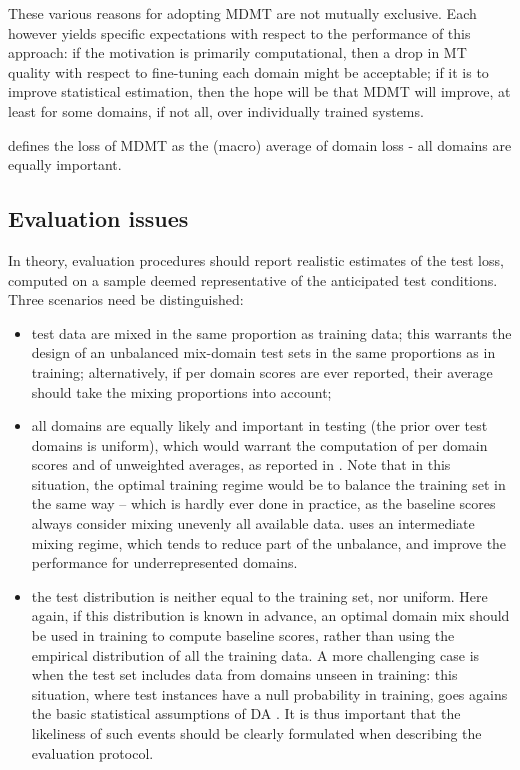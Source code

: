\documentclass[11pt]{article}
\begin{document}
These various reasons for adopting MDMT are not mutually exclusive. Each however yields specific expectations with respect to the performance of this approach: if the motivation is primarily computational, then a drop in MT quality with respect to fine-tuning each domain might be acceptable; if it is to improve statistical estimation, then the hope will be that MDMT will improve, at least for some domains, if not all, over individually trained systems.

\cite[eq. (3)]{Wang20general} defines the loss of MDMT as the (macro) average of domain loss - all domains are equally important.

\subsection{Evaluation issues \label{ssec:evaluation}}

In theory, evaluation procedures should report realistic estimates of the test loss, computed on a sample deemed representative of the anticipated test conditions. Three scenarios need be distinguished:
\begin{itemize}
\item test data are mixed in the same proportion as training data; this warrants the design of an unbalanced mix-domain test sets in the same proportions as in training; alternatively, if per domain scores are ever reported, their average should take the mixing proportions into account;
\item all domains are equally likely and important in testing (the prior over test domains is uniform), which would warrant the computation of per domain scores and of unweighted averages, as reported in \cite{Farajian17multidomain,Su19exploring}. Note that in this situation, the optimal training regime would be to balance the training set in the same way -- which is hardly ever done in practice, as the baseline scores always consider mixing unevenly all available data. \cite{Wang20general} uses an intermediate mixing regime, which tends to reduce part of the unbalance, and improve the performance for underrepresented domains.
\item the test distribution is neither equal to the training set, nor uniform. Here again, if this distribution is known in advance, an optimal domain mix should be used in training to compute baseline scores, rather than using the empirical distribution of all the training data. A more challenging case is when the test set includes data from domains unseen in training: this situation, where test instances have a null probability in training, goes agains the basic statistical assumptions of DA \cite{Shimodaira00improving}. It is thus important that the likeliness of such events should be clearly formulated when describing the evaluation protocol.
\end{itemize}
\end{document}
